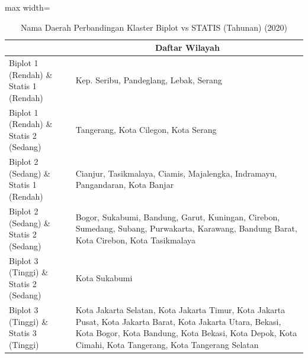 \begin{table}[H]
\centering
\caption{Nama Daerah Perbandingan Klaster Biplot vs STATIS (Tahunan) (2020)} \label{tab:app1biplot_statis_comp_name_2020}
\begin{adjustbox}{max width=\textwidth}
\begin{tabular}{|>{\centering\arraybackslash}p{4cm}|p{10cm}|}
\hline
\multicolumn{1}{|c|}{\textbf{Kategori}} & \multicolumn{1}{c|}{\textbf{Daftar Wilayah}} \\
\hline
Biplot 1 (Rendah) \& Statis 1 (Rendah) & Kep. Seribu, Pandeglang, Lebak, Serang \\
\hline
Biplot 1 (Rendah) \& Statis 2 (Sedang) & Tangerang, Kota Cilegon, Kota Serang \\
\hline
Biplot 2 (Sedang) \& Statis 1 (Rendah) & Cianjur, Tasikmalaya, Ciamis, Majalengka, Indramayu, Pangandaran, Kota Banjar \\
\hline
Biplot 2 (Sedang) \& Statis 2 (Sedang) & Bogor, Sukabumi, Bandung, Garut, Kuningan, Cirebon, Sumedang, Subang, Purwakarta, Karawang, Bandung Barat, Kota Cirebon, Kota Tasikmalaya \\
\hline
Biplot 3 (Tinggi) \& Statis 2 (Sedang) & Kota Sukabumi \\
\hline
Biplot 3 (Tinggi) \& Statis 3 (Tinggi) & Kota Jakarta Selatan, Kota Jakarta Timur, Kota Jakarta Pusat, Kota Jakarta Barat, Kota Jakarta Utara, Bekasi, Kota Bogor, Kota Bandung, Kota Bekasi, Kota Depok, Kota Cimahi, Kota Tangerang, Kota Tangerang Selatan \\
\hline
\end{tabular}
\end{adjustbox}
\end{table}